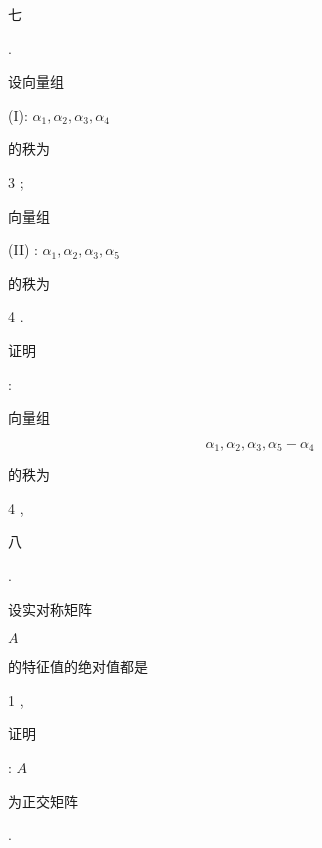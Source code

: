 \documentclass[10pt]{article}
\begin{document}
\begin{CJK}{UTF8}{mj}七\end{CJK}. \begin{CJK}{UTF8}{mj}设向量组\end{CJK} (I): $\alpha_{1}, \alpha_{2}, \alpha_{3}, \alpha_{4}$ \begin{CJK}{UTF8}{mj}的秩为\end{CJK} 3 ; \begin{CJK}{UTF8}{mj}向量组\end{CJK} (II) : $\alpha_{1}, \alpha_{2}, \alpha_{3}, \alpha_{5}$ \begin{CJK}{UTF8}{mj}的秩为\end{CJK} 4 . \begin{CJK}{UTF8}{mj}证明\end{CJK}: \begin{CJK}{UTF8}{mj}向量组\end{CJK}
$$
\alpha_{1}, \alpha_{2}, \alpha_{3}, \alpha_{5}-\alpha_{4}
$$
\begin{CJK}{UTF8}{mj}的秩为\end{CJK} 4 ,

\begin{CJK}{UTF8}{mj}八\end{CJK}. \begin{CJK}{UTF8}{mj}设实对称矩阵\end{CJK} $A$ \begin{CJK}{UTF8}{mj}的特征值的绝对值都是\end{CJK} 1 , \begin{CJK}{UTF8}{mj}证明\end{CJK}: $A$ \begin{CJK}{UTF8}{mj}为正交矩阵\end{CJK}.
\end{document}

